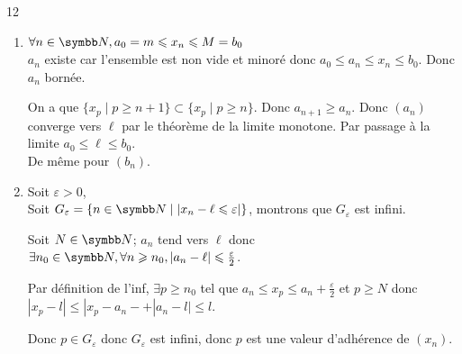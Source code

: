 \begin{correction}{12}
\begin{enumerate}
    \item $\forall n \in \N, a_0 = m \leqslant x_n \leqslant M = b_0$\\
    
    $a_n$ existe car l'ensemble est non vide et minoré donc $a_0 \leqslant a_n \leqslant x_n \leqslant b_0$. Donc $a_n$ bornée.

    On a que $\{x_p \mid p \geqslant n + 1\} \subset \{x_p \mid p \geqslant n\}$. Donc $a_{n+1} \geqslant a_n$. 
    Donc $(a_n)$ converge vers $\ell$ par le théorème de la limite monotone. 
    Par passage à la limite $a_0 \leqslant \ell \leqslant b_0$.\\

    De même pour $(b_n)$.
    \item Soit $\varepsilon > 0$,\\

    Soit $G_{\varepsilon} = \{n \in \N \mid |x_n - \ell \leqslant \varepsilon|\}$, montrons que $G_{\varepsilon}$ est infini.

    Soit $N \in \N$;
    $a_n$ tend vers $\ell$ donc $\exists n_0 \in \N, \forall n \geqslant n_0, |a_n - \ell| \leqslant \frac{\varepsilon}2$.

    Par définition de l'inf, $\exists p \geqslant n_0$ tel que $a_n \leqslant x_p \leqslant a_n + \frac\varepsilon2$ 
    et $p \geqslant N$ donc $|x_p - l| \leqslant |x_p - a_n- + |a_n -l| \leqslant l$.

    Donc $p \in G_{\varepsilon}$ donc $G_{\varepsilon}$ est infini, donc $p$ est une valeur d'adhérence de $(x_n)$.
\end{enumerate}
\end{correction}

